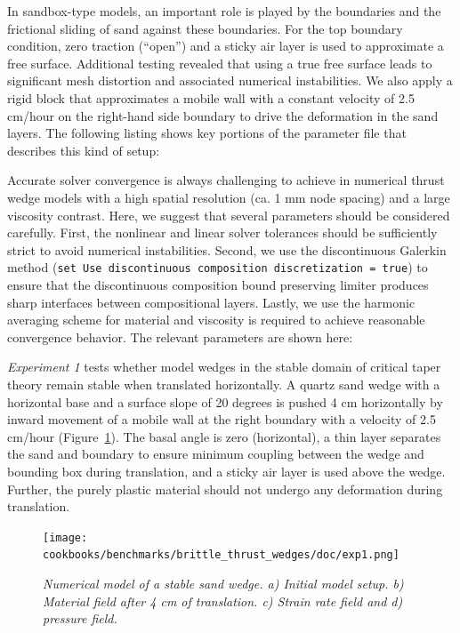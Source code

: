 \documentclass{article}
\begin{document}
In sandbox-type models, an important role is played by the boundaries and the
frictional sliding of sand against these boundaries. For the top boundary condition,
zero traction (``open'') and a sticky air layer is used to approximate a free surface.
Additional testing revealed that using a true free surface leads to significant
mesh distortion and associated numerical instabilities. We also apply a rigid block
that approximates a mobile wall with a constant velocity of 2.5 cm/hour on the
right-hand side boundary to drive the deformation in the sand layers. The following
listing shows key portions of the parameter file that describes this kind of setup:



Accurate solver convergence is always challenging to achieve in numerical thrust
wedge models with a high spatial resolution (ca. 1 mm node spacing) and a large
viscosity contrast. Here, we suggest that several parameters should be considered
carefully. First, the nonlinear and linear solver tolerances should be sufficiently
strict to avoid numerical instabilities. Second, we use the discontinuous Galerkin
method (\texttt{set Use discontinuous composition discretization = true}) to ensure
that the discontinuous composition bound preserving limiter produces sharp interfaces
between compositional layers. Lastly, we use the harmonic averaging scheme for
material and viscosity is required to achieve reasonable convergence behavior. The
relevant parameters are shown here:



\textit{Experiment 1} tests whether model wedges in the stable domain of critical
taper theory remain stable when translated horizontally. A quartz sand wedge with
a horizontal base and a surface slope of 20 degrees is pushed 4 cm horizontally by
inward movement of a mobile wall at the right boundary with a velocity of 2.5 cm/hour
(Figure~\ref{fig:btwexp1}). The basal angle is zero (horizontal), a thin layer separates
the sand and boundary to ensure minimum coupling between the wedge and bounding box
during translation, and a sticky air layer is used above the wedge. Further, the purely
plastic material should not undergo any deformation during translation.

\begin{figure}
\begin{center}
  \centering
  \texttt{[image: cookbooks/benchmarks/brittle\_thrust\_wedges/doc/exp1.png]}
  \caption{\it Numerical model of a stable sand wedge. a) Initial model setup. b) Material field after 4 cm of translation. c) Strain rate field and d) pressure field.}
  \label{fig:btwexp1}
\end{center}
\end{figure}
\end{document}
